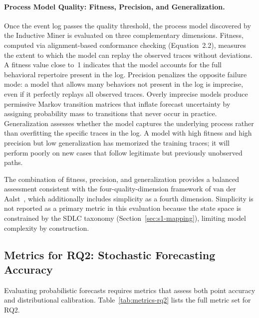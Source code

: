 \paragraph{Process Model Quality: Fitness, Precision, and Generalization.}
Once the event log passes the quality threshold, the process model
discovered by the Inductive Miner is evaluated on three
complementary dimensions.
Fitness, computed via alignment-based conformance checking
(Equation~2.2), measures the extent to which the model
can replay the observed traces without deviations.
A fitness value close to~1 indicates that the model accounts for the
full behavioral repertoire present in the log.
Precision penalizes the opposite failure mode: a model that allows
many behaviors not present in the log is imprecise, even if it
perfectly replays all observed traces.
Overly imprecise models produce permissive Markov transition matrices
that inflate forecast uncertainty by assigning probability mass to
transitions that never occur in practice.
Generalization assesses whether the model captures the underlying
process rather than overfitting the specific traces in the log.
A model with high fitness and high precision but low generalization
has memorized the training traces; it will perform poorly on new cases
that follow legitimate but previously unobserved paths.
 
The combination of fitness, precision, and generalization provides a
balanced assessment consistent with the four-quality-dimension
framework of van der Aalst~\cite{aalst2016process}, which
additionally includes simplicity as a fourth dimension.
Simplicity is not reported as a primary metric in this evaluation
because the state space is constrained by the SDLC taxonomy
(Section~\ref{sec:s1-mapping}), limiting model complexity by
construction.
 
\subsection{Metrics for RQ2: Stochastic Forecasting Accuracy}
\label{sec:metrics-rq2}
 
Evaluating probabilistic forecasts requires metrics that assess both
point accuracy and distributional calibration.
Table~\ref{tab:metrics-rq2} lists the full metric set for RQ2.
 
